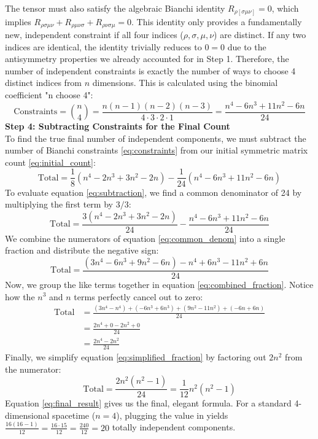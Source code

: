 \documentclass[11pt, a4paper]{report}
\begin{document}
The tensor must also satisfy the algebraic Bianchi identity $R_{\rho[\sigma\mu\nu]} = 0$, which implies $R_{\rho\sigma\mu\nu} + R_{\rho\mu\nu\sigma} + R_{\rho\nu\sigma\mu} = 0$. This identity only provides a fundamentally new, independent constraint if all four indices ($\rho, \sigma, \mu, \nu$) are distinct. If any two indices are identical, the identity trivially reduces to $0=0$ due to the antisymmetry properties we already accounted for in Step 1. Therefore, the number of independent constraints is exactly the number of ways to choose 4 distinct indices from $n$ dimensions. This is calculated using the binomial coefficient "n choose 4":
\begin{equation} \text{Constraints} = \binom{n}{4} = \frac{n(n-1)(n-2)(n-3)}{4 \cdot 3 \cdot 2 \cdot 1} = \frac{n^4 - 6n^3 + 11n^2 - 6n}{24} \label{eq:constraints} \end{equation}
\textbf{Step 4: Subtracting Constraints for the Final Count} \\
To find the true final number of independent components, we must subtract the number of Bianchi constraints \eqref{eq:constraints} from our initial symmetric matrix count \eqref{eq:initial_count}:
\begin{equation} \text{Total} = \frac{1}{8}(n^4 - 2n^3 + 3n^2 - 2n) - \frac{1}{24}(n^4 - 6n^3 + 11n^2 - 6n) \label{eq:subtraction} \end{equation}
To evaluate equation \eqref{eq:subtraction}, we find a common denominator of 24 by multiplying the first term by $3/3$:
\begin{equation} \text{Total} = \frac{3(n^4 - 2n^3 + 3n^2 - 2n)}{24} - \frac{n^4 - 6n^3 + 11n^2 - 6n}{24} \label{eq:common_denom} \end{equation}
We combine the numerators of equation \eqref{eq:common_denom} into a single fraction and distribute the negative sign:
\begin{equation} \text{Total} = \frac{(3n^4 - 6n^3 + 9n^2 - 6n) - n^4 + 6n^3 - 11n^2 + 6n}{24} \label{eq:combined_fraction} \end{equation}
Now, we group the like terms together in equation \eqref{eq:combined_fraction}. Notice how the $n^3$ and $n$ terms perfectly cancel out to zero:
\begin{align}
\text{Total} &= \frac{(3n^4 - n^4) + (-6n^3 + 6n^3) + (9n^2 - 11n^2) + (-6n + 6n)}{24} \nonumber \\
             &= \frac{2n^4 + 0 - 2n^2 + 0}{24} \nonumber \\
             &= \frac{2n^4 - 2n^2}{24} \label{eq:simplified_fraction}
\end{align}
Finally, we simplify equation \eqref{eq:simplified_fraction} by factoring out $2n^2$ from the numerator:
\begin{equation} \text{Total} = \frac{2n^2(n^2 - 1)}{24} = \frac{1}{12}n^2(n^2 - 1) \label{eq:final_result} \end{equation}
Equation \eqref{eq:final_result} gives us the final, elegant formula. For a standard 4-dimensional spacetime ($n=4$), plugging the value in yields $\frac{16(16-1)}{12} = \frac{16 \cdot 15}{12} = \frac{240}{12} = 20$ totally independent components.
\end{document}
